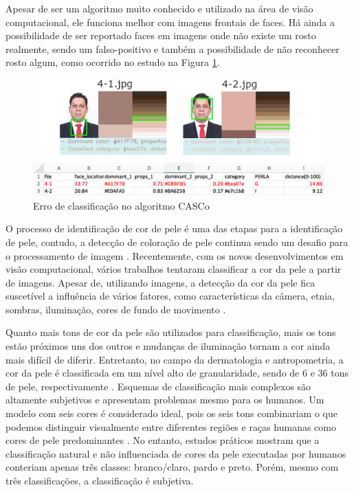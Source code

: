 Apesar de ser um algoritmo muito conhecido e utilizado na área de visão computacional, ele funciona melhor com imagens frontais de faces. Há ainda a possibilidade de ser reportado faces em imagens onde não existe um rosto realmente, sendo um falso-positivo e também a possibilidade de não reconhecer rosto algum, como ocorrido no estudo \cite{Classification_Algorithm_for_Skin_Color_CASCo_A_new_tool} na Figura \ref{fig:x casco-miss-identification}.

\begin{figure}[h]
\caption{Erro de classificação no algoritmo CASCo }
\centering

\includegraphics[scale=3]{Template_Latex_TCC-UNIFTEC/_lib/imagens/casco.jpg}

\label{fig:x casco-miss-identification}
\end{figure}


O processo de identificação de cor de pele é uma das etapas para a identificação de pele, contudo, a detecção de coloração de pele continua sendo um desafio para o processamento de imagem \cite{Human_Skin_Color_Detection_Technique_Using_Different_Color_Models}. Recentemente, com os novos desenvolvimentos em visão computacional, vários trabalhos tentaram classificar a cor da pele a partir de imagens. Apesar de, utilizando imagens, a detecção da cor da pele fica suscetível a influência de vários fatores, como características da câmera, etnia, sombras, iluminação, cores de fundo de movimento \cite{Human_Skin_Detection_Using_Different_Color_Spaces}.
 
Quanto mais tons de cor da pele são utilizados para classificação, mais os tons estão próximos uns dos outros e mudanças de iluminação tornam a cor ainda mais difícil de diferir. Entretanto, no campo da dermatologia e antropometria, a cor da pele é classificada em um nível alto de granularidade, sendo de 6 e 36 tons de pele, respectivamente \cite{Automatic_Skin_Tone_Extraction_for_Visagism_Applications}. Esquemas de classificação mais complexos são altamente subjetivos e apresentam problemas mesmo para os humanos. Um modelo com seis cores é considerado ideal, pois os seis tons combinariam o que podemos distinguir visualmente entre diferentes regiões e raças humanas como cores de pele predominantes \cite{Visagismo}. No entanto, estudos práticos mostram que a classificação natural e não influenciada de cores da pele executadas por humanos conteriam apenas três classes: branco/claro, pardo e preto. Porém, mesmo com três classificações, a classificação é subjetiva.


